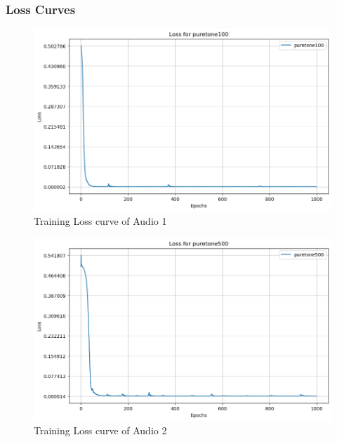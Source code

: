 \documentclass{ioereport}
\begin{document}
    \subsubsection{Loss Curves}
    \begin{figure}[H]
        \centering
        \includegraphics[width=\linewidth]{assets/audio_loss_curves/puretone100.png}
        \caption{Training Loss curve of Audio 1}
        \label{fig:loss-curve-1}
    \end{figure}
    \begin{figure}[H]
        \centering
        \includegraphics[width=\linewidth]{assets/audio_loss_curves/puretone500.png}
        \caption{Training Loss curve of Audio 2}
        \label{fig:loss-curve-2}
    \end{figure}
\end{document}
